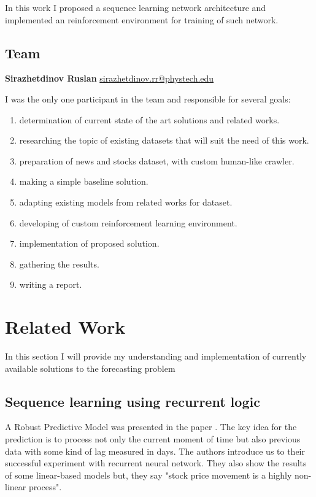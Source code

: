 \documentclass{article}
\begin{document}
In this work I proposed a sequence learning network architecture and implemented an reinforcement environment for training of such network.

\subsection{Team}
\textbf{Sirazhetdinov Ruslan} \href{mailto:sirazhetdinov.rr@phystech.edu}{sirazhetdinov.rr@phystech.edu}

I was the only one participant in the team and responsible for several goals:

\begin{enumerate}
  \item  determination of current state of the art solutions and related works.
  \item  researching the topic of existing datasets that will suit the need of this work.
  \item  preparation of news and stocks dataset, with custom human-like crawler.
  \item  making a simple baseline solution.
  \item  adapting existing models from related works for dataset.
  \item  developing of custom reinforcement learning environment.
  \item  implementation of proposed solution.
  \item  gathering the results.
  \item  writing a report.
  
\end{enumerate}


\section{Related Work}
\label{sec:related}

In this section I will provide my understanding and implementation of currently available solutions to the forecasting problem

\subsection{Sequence learning using recurrent logic}
A Robust Predictive Model was presented in the paper \cite{Sen_2021}.
The key idea for the prediction is to process not only the current moment of time but also previous data with some kind of lag measured in days.
The authors introduce us to their successful experiment with recurrent neural network. They also show the results of some linear-based models but, they say "stock price movement is a highly non-linear process".
\end{document}
